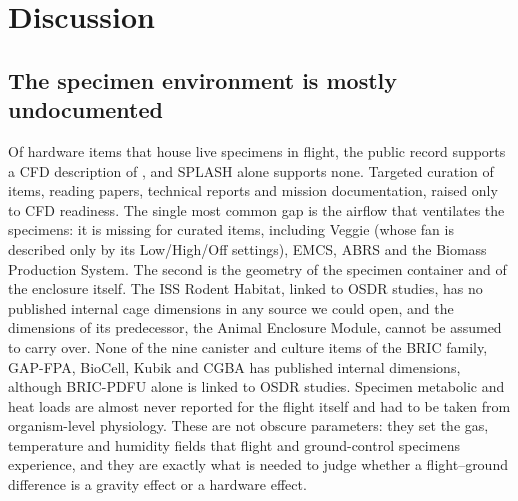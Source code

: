 \documentclass[11pt]{article}
\begin{document}
\section{Discussion}
\subsection{The specimen environment is mostly undocumented}
Of \hwNHabitats{} hardware items that house live specimens in flight, the public record supports a CFD
description of \hwTierPublicTierA{}, and SPLASH alone supports none. Targeted curation of \hwNCurated{} items,
reading papers, technical reports and mission documentation, raised only \hwNCuratedA{} to CFD readiness.
The single most common gap is the airflow that ventilates the specimens: it is missing for
\hwNMissingFTwo{} curated items, including Veggie (whose fan is described only by its Low/High/Off
settings), EMCS, ABRS and the Biomass Production System. The second is the geometry of the specimen
container and of the enclosure itself. The ISS Rodent Habitat, linked to \hwNStudiesRodentHabitat{} OSDR
studies, has no published internal cage dimensions in any source we could open, and the dimensions of its
predecessor, the Animal Enclosure Module, cannot be assumed to carry over. None of the nine canister and culture items of the BRIC family,
GAP-FPA, BioCell, Kubik and CGBA has published internal dimensions, although BRIC-PDFU alone is linked to
\hwNStudiesBricPdfu{} OSDR studies. Specimen metabolic and heat loads are almost
never reported for the flight itself and had to be taken from organism-level physiology. These are not
obscure parameters: they set the gas, temperature and humidity fields that flight and ground-control
specimens experience, and they are exactly what is needed to judge whether a flight--ground difference is
a gravity effect or a hardware effect.
\end{document}
